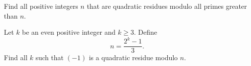 \documentclass{subfile}
\begin{document}
	\begin{problem}
		Find all positive integers $n$ that are quadratic residues modulo all primes greater than $n$.
	\end{problem}
	
	
	\begin{problem}
		Let $k$ be an even positive integer and $k\ge 3$. Define $$n=\frac{2^k-1}{3}.$$ Find all $k$ such that $(-1)$ is a quadratic residue modulo $n$.
	\end{problem}
	
	
\end{document}
